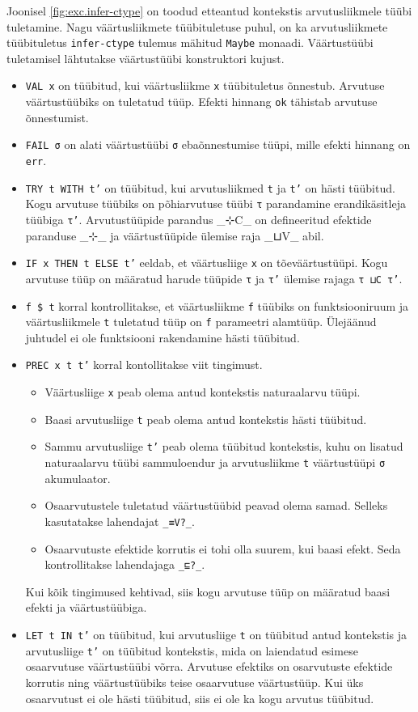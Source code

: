 \documentclass[a4paper,12pt]{article}
\begin{document}
Joonisel \ref{fig:exc.infer-ctype} on toodud etteantud kontekstis arvutusliikmele tüübi tuletamine.
Nagu väärtusliikmete tüübituletuse puhul, on ka arvutusliikmete tüübituletus {\tt infer-ctype} tulemus mähitud {\tt Maybe} monaadi.
Väärtustüübi tuletamisel lähtutakse väärtustüübi konstruktori kujust.
\begin{itemize}
\item {\tt VAL x} on tüübitud, kui väärtusliikme {\tt x} tüübituletus õnnestub. Arvutuse väärtustüübiks on tuletatud tüüp. Efekti hinnang {\tt ok} tähistab arvutuse õnnestumist. 
\item {\tt FAIL σ} on alati väärtustüübi {\tt σ} ebaõnnestumise tüüpi, mille efekti hinnang on {\tt err}.
\item {\tt TRY t WITH t'} on tüübitud, kui arvutusliikmed {\tt t} ja {\tt t'} on hästi tüübitud. Kogu arvutuse tüübiks on põhiarvutuse tüübi {\tt τ} parandamine erandikäsitleja tüübiga {\tt τ'}. Arvutustüüpide parandus _⊹C_ on defineeritud efektide paranduse _⊹_ ja väärtustüüpide ülemise raja _⊔V_ abil.
\item {\tt IF x THEN t ELSE t'} eeldab, et väärtusliige {\tt x} on tõeväärtustüüpi. Kogu arvutuse tüüp on määratud harude tüüpide {\tt τ} ja {\tt τ'} ülemise rajaga {\tt τ ⊔C τ'}.
\item {\tt f \$ t} korral kontrollitakse, et väärtusliikme {\tt f} tüübiks on funktsiooniruum ja väärtusliikmele {\tt t} tuletatud tüüp on {\tt f} parameetri alamtüüp. Ülejäänud juhtudel ei ole funktsiooni rakendamine hästi tüübitud.
\item {\tt PREC x t t'} korral kontollitakse viit tingimust.
  \begin{itemize}
  \item Väärtusliige {\tt x} peab olema antud kontekstis naturaalarvu tüüpi.
  \item Baasi arvutusliige {\tt t} peab olema antud kontekstis hästi tüübitud.
  \item Sammu arvutusliige {\tt t'} peab olema tüübitud kontekstis, kuhu on lisatud naturaalarvu tüübi sammuloendur ja arvutusliikme {\tt t} väärtustüüpi {\tt σ} akumulaator.
  \item Osaarvutustele tuletatud väärtustüübid peavad olema samad. Selleks kasutatakse lahendajat {\tt _≡V?_}.
  \item Osaarvutuste efektide korrutis ei tohi olla suurem, kui baasi efekt. Seda kontrollitakse lahendajaga {\tt _⊑?_}.
  \end{itemize}
  Kui kõik tingimused kehtivad, siis kogu arvutuse tüüp on määratud baasi efekti ja väärtustüübiga.
\item {\tt LET t IN t'} on tüübitud, kui arvutusliige {\tt t} on tüübitud antud kontekstis ja arvutusliige {\tt t'} on tüübitud kontekstis, mida on laiendatud esimese osaarvutuse väärtustüübi võrra. Arvutuse efektiks on osarvutuste efektide korrutis ning väärtustüübiks teise osaarvutuse väärtustüüp. Kui üks osaarvutust ei ole hästi tüübitud, siis ei ole ka kogu arvutus tüübitud.
\end{itemize}
\end{document}
